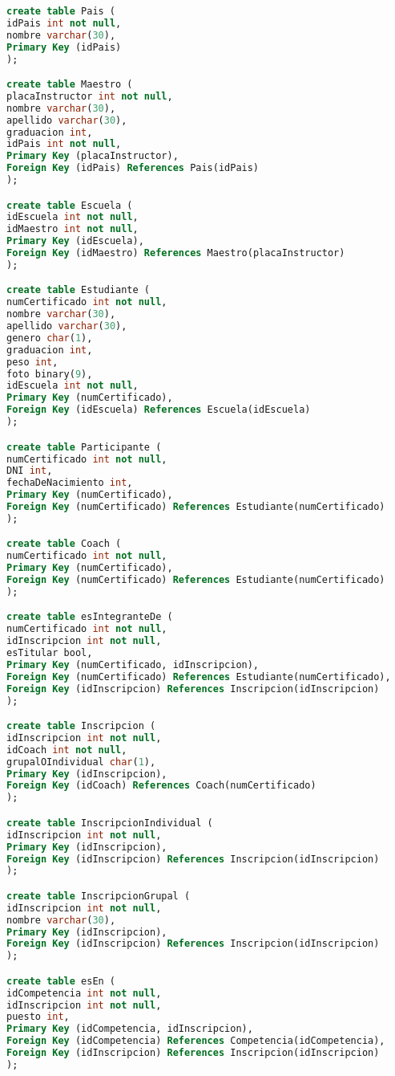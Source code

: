 \documentclass[hidelinks,a4paper,11pt, nofootinbib]{article}
\begin{document}
\begin{lstlisting}[language=SQL]
create table Pais (
idPais int not null,
nombre varchar(30),
Primary Key (idPais)
);

create table Maestro (
placaInstructor int not null,
nombre varchar(30),
apellido varchar(30),
graduacion int,
idPais int not null,
Primary Key (placaInstructor),
Foreign Key (idPais) References Pais(idPais)
);

create table Escuela (
idEscuela int not null,
idMaestro int not null,
Primary Key (idEscuela),
Foreign Key (idMaestro) References Maestro(placaInstructor)
);

create table Estudiante (
numCertificado int not null,
nombre varchar(30),
apellido varchar(30),
genero char(1),
graduacion int,
peso int,
foto binary(9),
idEscuela int not null,
Primary Key (numCertificado),
Foreign Key (idEscuela) References Escuela(idEscuela)
);

create table Participante (
numCertificado int not null,
DNI int,
fechaDeNacimiento int,
Primary Key (numCertificado),
Foreign Key (numCertificado) References Estudiante(numCertificado)
);

create table Coach (
numCertificado int not null,
Primary Key (numCertificado),
Foreign Key (numCertificado) References Estudiante(numCertificado)
);

create table esIntegranteDe (
numCertificado int not null,
idInscripcion int not null,
esTitular bool,
Primary Key (numCertificado, idInscripcion),
Foreign Key (numCertificado) References Estudiante(numCertificado),
Foreign Key (idInscripcion) References Inscripcion(idInscripcion)
);

create table Inscripcion (
idInscripcion int not null,
idCoach int not null,
grupalOIndividual char(1),
Primary Key (idInscripcion),
Foreign Key (idCoach) References Coach(numCertificado)
);

create table InscripcionIndividual (
idInscripcion int not null,
Primary Key (idInscripcion),
Foreign Key (idInscripcion) References Inscripcion(idInscripcion)
);

create table InscripcionGrupal (
idInscripcion int not null,
nombre varchar(30),
Primary Key (idInscripcion),
Foreign Key (idInscripcion) References Inscripcion(idInscripcion)
);

create table esEn (
idCompetencia int not null,
idInscripcion int not null,
puesto int,
Primary Key (idCompetencia, idInscripcion),
Foreign Key (idCompetencia) References Competencia(idCompetencia),
Foreign Key (idInscripcion) References Inscripcion(idInscripcion)
);


\end{lstlisting}
\end{document}
